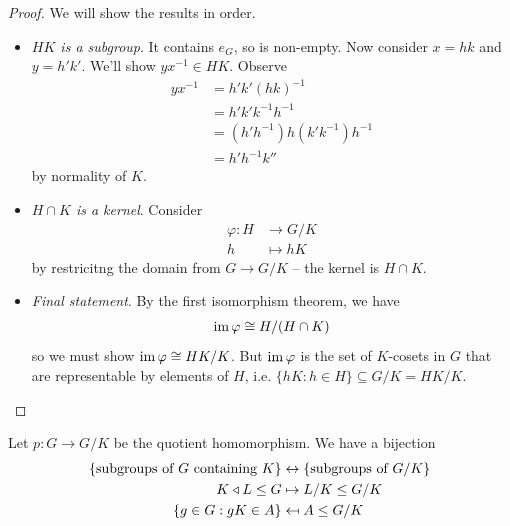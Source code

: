 \documentclass{../template/note}
\begin{document}
    \begin{proof}
        We will show the results in order.
        \begin{itemize}
            \item \emph{$HK$ is a subgroup}. It contains $e_G$, so is non-empty. Now consider $x = hk$ and $y = h'k'$. We'll show $yx^{-1} \in HK$. Observe
            \begin{align*}
                yx^{-1} &= h'k'(hk)^{-1} \\
                &= h'k'k^{-1}h^{-1} \\
                &= (h'h^{-1})h(k'k^{-1})h^{-1} \\
                &= h'h^{-1}k''
            \end{align*}
            by normality of $K$.
        \end{itemize}
        \begin{itemize}[resume]
            \item \emph{$H \cap K$ is a kernel}. Consider
            \begin{align*}
                \varphi: H &\to G/K \\
                h &\mapsto hK
            \end{align*}
            by restricitng the domain from $G \to G/K$ -- the kernel is $H \cap K$.
            \item \emph{Final statement}. By the first isomorphism theorem, we have
            \begin{align*}
                \operatorname{im} \varphi \cong H/(H \cap K)
            \end{align*}
            so we must show $\operatorname{im} \varphi \cong HK/K$. But $\operatorname{im} \varphi$ is the set of $K$-cosets in $G$ that are representable by elements of $H$, i.e. $\{hK : h \in H\} \subseteq G/K = HK/K$.
        \end{itemize}
    \end{proof}

    \begin{theorem}
        Let $p: G \to G/K$ be the quotient homomorphism. We have a bijection
        \begin{align*}
            \{\text{subgroups of } G \text{ containing } K\}& \leftrightarrow \{\text{subgroups of } G/K\} \\
            K \triangleleft L \leq G &\mapsto L/K \leq G/K \\
            \{g \in G : gK \in A\} &\mapsfrom A \leq G/K
        \end{align*}
    \end{theorem}
\end{document}
